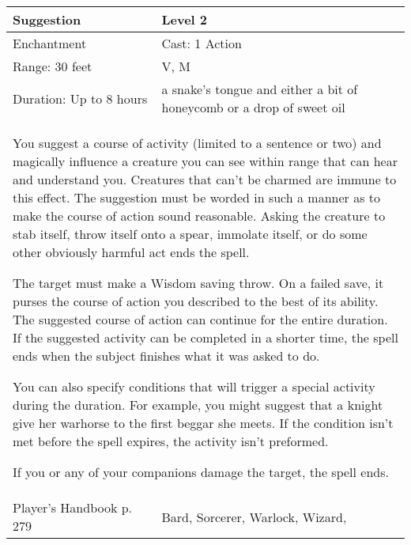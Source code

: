 \documentclass[11pt]{report}
\begin{document}
\begin{table}[H]
	\begin{tabular}{||p{6cm}|p{6cm}||}
		\hline\hline
		\bf{Suggestion} & Level 2\\ \hline
		Enchantment & Cast: 1 Action\\ \hline
		Range: 30 feet & V, M\\ \hline
		Duration: Up to 8 hours & a snake’s tongue and either a bit of honeycomb or a drop of sweet oil\\ \hline
		\multicolumn{2}{||p{12cm}||}{You suggest a course of activity (limited to a sentence or two) and magically influence a creature you can see within range that can hear and understand you. Creatures that can’t be charmed are immune to this effect. The suggestion must be worded in such a manner as to make the course of action sound reasonable. Asking the creature to stab itself, throw itself onto a spear, immolate itself, or do some other obviously harmful act ends the spell.

The target must make a Wisdom saving throw. On a failed save, it purses the course of action you described to the best of its ability. The suggested course of action can continue for the entire duration. If the suggested activity can be completed in a shorter time, the spell ends when the subject finishes what it was asked to do.

You can also specify conditions that will trigger a special activity during the duration. For example, you might suggest that a knight give her warhorse to the first beggar she meets. If the condition isn’t met before the spell expires, the activity isn’t preformed.

If you or any of your companions damage the target, the spell ends.}\\ \hline
Player's Handbook p. 279 & Bard, Sorcerer, Warlock, Wizard, \\ \hline\hline
	\end{tabular}
\end{table}
\end{document}
